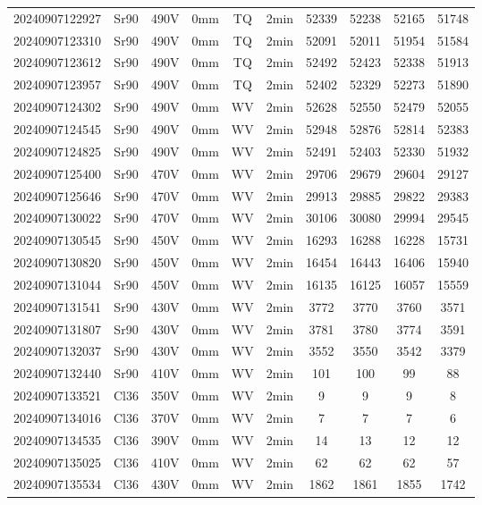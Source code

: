 \begin{center}
{\begin{longtable}{c c c c c c c c c c}
    20240907122927 & Sr90 & 490V & 0mm & TQ & 2min & 52339 & 52238 & 52165 & 51748 \\
    20240907123310 & Sr90 & 490V & 0mm & TQ & 2min & 52091 & 52011 & 51954 & 51584 \\
    20240907123612 & Sr90 & 490V & 0mm & TQ & 2min & 52492 & 52423 & 52338 & 51913 \\
    20240907123957 & Sr90 & 490V & 0mm & TQ & 2min & 52402 & 52329 & 52273 & 51890 \\
    20240907124302 & Sr90 & 490V & 0mm & WV & 2min & 52628 & 52550 & 52479 & 52055 \\
    20240907124545 & Sr90 & 490V & 0mm & WV & 2min & 52948 & 52876 & 52814 & 52383 \\
    20240907124825 & Sr90 & 490V & 0mm & WV & 2min & 52491 & 52403 & 52330 & 51932 \\
    20240907125400 & Sr90 & 470V & 0mm & WV & 2min & 29706 & 29679 & 29604 & 29127 \\
    20240907125646 & Sr90 & 470V & 0mm & WV & 2min & 29913 & 29885 & 29822 & 29383 \\
    20240907130022 & Sr90 & 470V & 0mm & WV & 2min & 30106 & 30080 & 29994 & 29545 \\
    20240907130545 & Sr90 & 450V & 0mm & WV & 2min & 16293 & 16288 & 16228 & 15731 \\
    20240907130820 & Sr90 & 450V & 0mm & WV & 2min & 16454 & 16443 & 16406 & 15940 \\
    20240907131044 & Sr90 & 450V & 0mm & WV & 2min & 16135 & 16125 & 16057 & 15559 \\
    20240907131541 & Sr90 & 430V & 0mm & WV & 2min & 3772 & 3770 & 3760 & 3571 \\
    20240907131807 & Sr90 & 430V & 0mm & WV & 2min & 3781 & 3780 & 3774 & 3591 \\
    20240907132037 & Sr90 & 430V & 0mm & WV & 2min & 3552 & 3550 & 3542 & 3379 \\
    20240907132440 & Sr90 & 410V & 0mm & WV & 2min & 101 & 100 & 99 & 88 \\
    20240907133521 & Cl36 & 350V & 0mm & WV & 2min & 9 & 9 & 9 & 8 \\
    20240907134016 & Cl36 & 370V & 0mm & WV & 2min & 7 & 7 & 7 & 6 \\
    20240907134535 & Cl36 & 390V & 0mm & WV & 2min & 14 & 13 & 12 & 12 \\
    20240907135025 & Cl36 & 410V & 0mm & WV & 2min & 62 & 62 & 62 & 57 \\
    20240907135534 & Cl36 & 430V & 0mm & WV & 2min & 1862 & 1861 & 1855 & 1742 \\

\end{longtable}}
\end{center}
